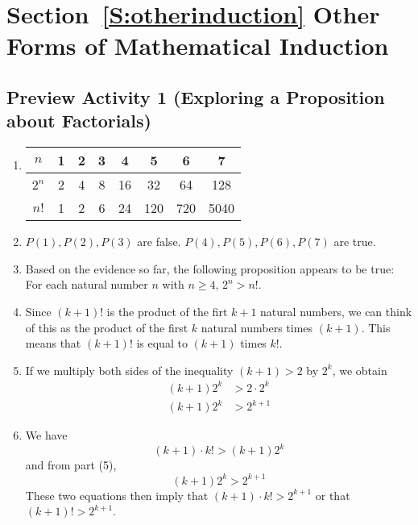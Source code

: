 \section*{Section~\ref{S:otherinduction} Other Forms of Mathematical Induction}

\subsection*{Preview Activity 1 (Exploring a Proposition about Factorials)}
\begin{enumerate}
\item
\begin{tabular}[t]{| c | c | c | c | c | c | c | c |} \hline
$n$  &  1  &  2  &  3  &  4  &  5  &  6  &  7  \\ \hline
$2^n$  &  2  &  4  &  8  &  16  &  32  &  64  &  128  \\ \hline
$n!$  &  1  &  2  &  6  &  24  &  120  &  720  &  5040  \\ \hline
\end{tabular}
\item $P(1), P(2), P(3)$ are false.  $P(4), P(5), P(6), P(7)$ are true.
\item Based on the evidence so far, the following proposition appears to be true:  For each natural number  
$n$ with $n \geq 4$, $2^n > n!$. 
\item Since $(k + 1)!$ is the product of the firt $k + 1$ natural numbers, we can think of this as the product of the first $k$ natural numbers times $(k + 1)$.  This means that $(k + 1)!$ is equal to $(k + 1)$ times $k!$.
\item If we multiply both sides of the inequality $(k + 1) > 2$ by $2^k$, we obtain 
\begin{align*}
(k + 1)2^k &> 2 \cdot 2^k \\
(k + 1)2^k &> 2^{k+1}
\end{align*}
\item We have
\begin{equation} 
(k + 1)\cdot k! > (k + 1) 2^k 
\end{equation}
and from part (5),
\begin{equation}
(k + 1)2^k > 2^{k+1}
\end{equation}
These two equations then imply that $(k + 1)\cdot k! > 2^{k+1}$ or that $(k + 1)! > 2^{k+1}$.

\end{enumerate}
\hbreak




